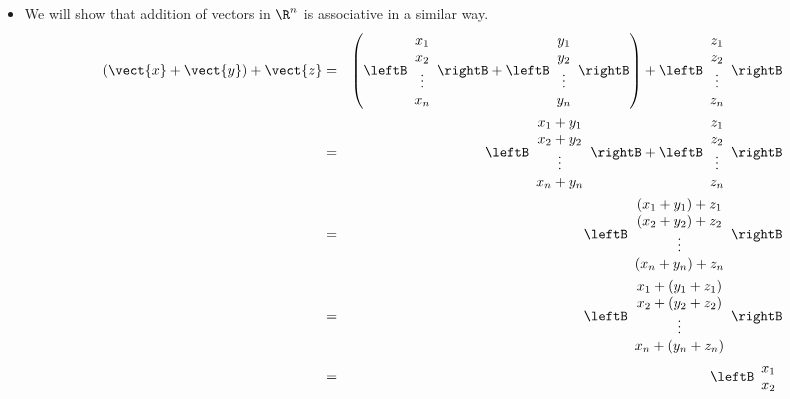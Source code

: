 \begin{solution}
\begin{itemize}
\item 
We will show that addition of vectors in $\R^n$ is associative in a similar way. 
\begin{eqnarray*} 
(\vect{x} + \vect{y}) + \vect{z} &=& 
\left(  \leftB \begin{array}{c}
x_1 \\
x_2 \\
\vdots \\
x_n
\end{array} \rightB +  \leftB \begin{array}{c}
y_1 \\
y_2 \\
\vdots \\
y_n
\end{array} \rightB \right)
+
 \leftB \begin{array}{c}
z_1 \\
z_2 \\
\vdots \\
z_n
\end{array} \rightB \\
&=& 
 \leftB \begin{array}{c}
x_1 + y_1 \\
x_2 + y_2 \\
\vdots \\
x_n + y_n
\end{array} \rightB  + \leftB \begin{array}{c}
z_1 \\
z_2 \\
\vdots \\
z_n
\end{array} \rightB \\
&=& 
\leftB \begin{array}{c}
(x_1 + y_1) + z_1 \\
(x_2 + y_2) + z_2\\
\vdots \\
(x_n + y_n) + z_n
\end{array} \rightB \\
&=& 
\leftB \begin{array}{c}
x_1 + (y_1 + z_1) \\
x_2 + (y_2 + z_2)\\
\vdots \\
x_n + (y_n + z_n)
\end{array} \rightB \\
&=& \leftB \begin{array}{c}
x_1 \\
x_2  \\

\end{array}
\end{eqnarray*}
\end{itemize}
\end{solution}
